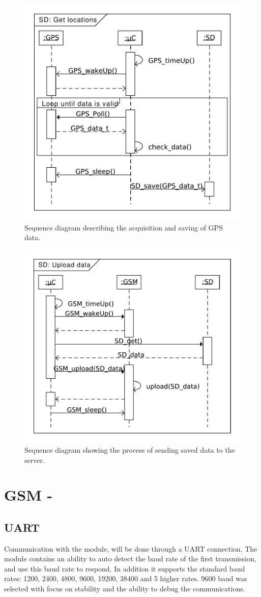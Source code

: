 \begin{figure}
	\centering
	\includegraphics[width=0.7\linewidth]{gfx/Design/SD_getLocation.pdf}
	\caption{Sequence diagram describing the acquisition and saving of GPS data.}
	\label{fig:SD:getlocation}
\end{figure}

\begin{figure}
	\centering
	\includegraphics[width=0.7\linewidth]{gfx/Design/SD_Upload.pdf}
	\caption{Sequence diagram showing the process of sending saved data to the server.}
	\label{fig:SD:upload}
\end{figure}

\section{GSM - \SARA}

\subsection{UART}
Communication with the \SARA module, will be done through a UART connection. The module contains an ability to auto detect the baud rate of the first transmission, and use this baud rate to respond. In addition it supports the standard baud rates: \num{1200}, \num{2400}, \num{4800}, \num{9600}, \num{19200}, \num{38400} and 5 higher rates. \num{9600} baud was selected with focus on stability and the ability to debug the communications.


